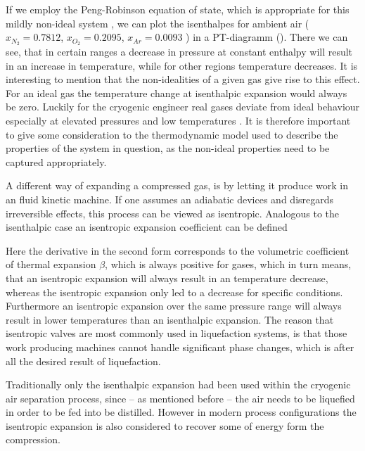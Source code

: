         If we employ the Peng-Robinson equation of state, which is appropriate for this mildly non-ideal system 
        \cite{AndreasPfennig.2003}, we can plot the isenthalpes for ambient air ($x_{N_2}=0.7812$, $x_{O_2}=0.2095$,
        $x_{Ar}=0.0093$ ) in a PT-diagramm ().
        There we can see, that in certain ranges a decrease in pressure at constant enthalpy will result 
        in an increase in temperature, while for other regions temperature decreases. It is interesting 
        to mention that the non-idealities of a given gas give rise to this effect. For an ideal gas the 
        temperature change at isenthalpic expansion would always be zero. Luckily for the cryogenic engineer 
        real gases deviate from ideal behaviour especially at elevated pressures and low temperatures \cite{Barron.1985}. 
        It is therefore important to give some consideration to the thermodynamic model used to describe the properties 
        of the system in question, as the non-ideal properties need to be captured appropriately.

        A different way of expanding a compressed gas, is by letting it produce work in an fluid kinetic machine.
        If one assumes an adiabatic devices and disregards irreversible effects, this process can be viewed as
        isentropic. Analogous to the isenthalpic case an isentropic expansion coefficient can be defined

        Here the derivative in the second form corresponds to the volumetric coefficient of thermal expansion
        $\beta$, which is always positive for gases, which in turn means, that an isentropic expansion
        will always result in an temperature decrease, whereas the isentropic expansion only led to a decrease for
        specific conditions. Furthermore an isentropic expansion over the same pressure range will always result in
        lower temperatures than an isenthalpic expansion. The reason that isentropic valves are most commonly used 
        in liquefaction systems, is that those work producing machines cannot handle significant phase changes, 
        which is after all the desired result of liquefaction.

        Traditionally only the isenthalpic expansion had been used within the cryogenic air separation process,
        since -- as mentioned before -- the air needs to be liquefied in order to be fed into be distilled. However
        in modern process configurations the isentropic expansion is also considered to recover some of energy 
        form the compression. 
